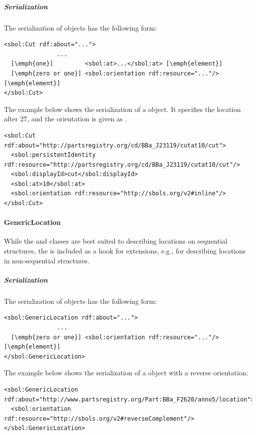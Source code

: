 \subparagraph{Serialization}

The serialization of  objects has the following form:
\begin{lstlisting}
<sbol:Cut rdf:about="...">
               ...   
  [\emph{one}]         <sbol:at>...</sbol:at> [\emph{element}] 
  [\emph{zero or one}] <sbol:orientation rdf:resource="..."/> [\emph{element}] 
</sbol:Cut>
\end{lstlisting}

The example below shows the serialization of a  object. It specifies the location after 27, and the orientation is given as .
\begin{lstlisting}
<sbol:Cut rdf:about="http://partsregistry.org/cd/BBa_J23119/cutat10/cut">
  <sbol:persistentIdentity rdf:resource="http://partsregistry.org/cd/BBa_J23119/cutat10/cut"/>
  <sbol:displayId>cut</sbol:displayId>
  <sbol:at>10</sbol:at>
  <sbol:orientation rdf:resource="http://sbols.org/v2#inline"/>
</sbol:Cut>
\end{lstlisting}


\paragraph{GenericLocation}
\label{sec:GenericLocation}

While the  and  classes are best suited to
describing locations on sequential structures, the
 is included as a hook for extensions, e.g., for
describing locations in non-sequential structures.


\subparagraph{Serialization}

The serialization of  objects has the following form:
\begin{lstlisting}
<sbol:GenericLocation rdf:about="...">
               ...   
  [\emph{zero or one}] <sbol:orientation rdf:resource="..."/> [\emph{element}] 
</sbol:GenericLocation>
\end{lstlisting}

The example below shows the serialization of a  object with a reverse orientation:
\begin{lstlisting}
<sbol:GenericLocation rdf:about="http://www.partsregistry.org/Part:BBa_F2620/anno5/location">
  <sbol:orientation rdf:resource="http://sbols.org/v2#reverseComplement"/>
</sbol:GenericLocation>
\end{lstlisting}

